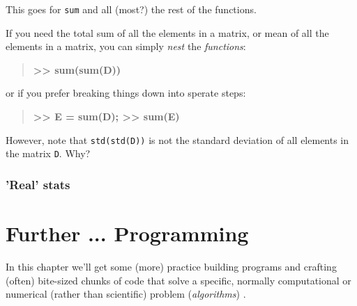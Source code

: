 \documentclass{tufte-book} %
\newenvironment{docspecbold}{\begin{quotation}\ttfamily\bfseries\parskip0pt\parindent0pt\ignorespaces}{\end{quotation}}
\begin{document}
This goes for \texttt{sum} and all (most?) the rest of the functions.

If you need the total sum of all the elements in a matrix, or mean of all the elements in a matrix, you can simply \textit{nest} the \textit{functions}:
\begin{docspecbold}
>> sum(sum(D))
\end{docspecbold}
or if you prefer breaking things down into sperate steps:
\begin{docspecbold}
>> E = sum(D);
>> sum(E)
\end{docspecbold}

However, note that \texttt{std(std(D))} is not the standard deviation of all elements in the matrix \texttt{D}. Why?



\subsection{'Real' stats}






\chapter{Further ... Programming}
\label{ch:04}


In this chapter we'll get some (more) practice building programs and crafting (often) bite-sized chunks of code that solve a specific, normally computational or numerical (rather than scientific) problem (\textit{algorithms})
.
\end{document}
